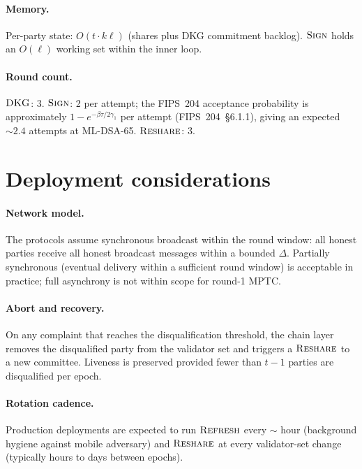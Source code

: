 \documentclass[11pt,a4paper]{article}
\theoremstyle{definition}
\theoremstyle{remark}
\newcommand{\Sign}{\textsc{Sign}}
\newcommand{\DKG}{\textsc{DKG}}
\newcommand{\Reshare}{\textsc{Reshare}}
\newcommand{\Refresh}{\textsc{Refresh}}
\begin{document}
\paragraph{Memory.}
Per-party state: $O(t \cdot k\ell)$ (shares plus DKG commitment
backlog). $\Sign$ holds an $O(\ell)$ working set within the inner
loop.

\paragraph{Round count.}
$\DKG$: 3. $\Sign$: 2 per attempt; the FIPS~204 acceptance
probability is approximately $1 - e^{-\beta\tau/2\gamma_1}$ per
attempt (FIPS~204~\S6.1.1), giving an expected $\sim 2.4$ attempts at
ML-DSA-65. $\Reshare$: 3.

\section{Deployment considerations}
\label{sec:deployment}

\paragraph{Network model.}
The protocols assume synchronous broadcast within the round window:
all honest parties receive all honest broadcast messages within a
bounded $\Delta$. Partially synchronous (eventual delivery within a
sufficient round window) is acceptable in practice; full
asynchrony is not within scope for round-1 MPTC.

\paragraph{Abort and recovery.}
On any complaint that reaches the disqualification threshold, the
chain layer removes the disqualified party from the validator set
and triggers a $\Reshare$ to a new committee. Liveness is preserved
provided fewer than $t-1$ parties are disqualified per epoch.

\paragraph{Rotation cadence.}
Production deployments are expected to run $\Refresh$ every
$\sim$ hour (background hygiene against mobile adversary) and
$\Reshare$ at every validator-set change (typically hours to days
between epochs).
\end{document}
